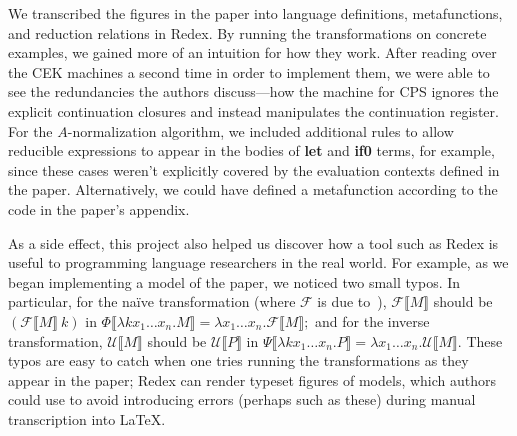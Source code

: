 \documentclass[11pt]{article}
\begin{document}
We transcribed the figures in the paper into language definitions,
metafunctions, and reduction relations in Redex. By running the transformations
on concrete examples, we gained more of an intuition for how they work. After
reading over the CEK machines a second time in order to implement them, we were
able to see the redundancies the authors discuss---how the machine for CPS
ignores the explicit continuation closures and instead manipulates the
continuation register. For the $A$-normalization algorithm, we included
additional rules to allow reducible expressions to appear in the bodies of
\textbf{let} and \textbf{if0} terms, for example, since these cases weren't
explicitly covered by the evaluation contexts defined in the paper.
Alternatively, we could have defined a metafunction according to the code in
the paper's appendix.

As a side effect, this project also helped us discover how a tool such as Redex
is useful to programming language researchers in the real world. For example,
as we began implementing a model of the paper, we noticed two small typos. In
particular, for the na\"{i}ve transformation (where $\mathcal{F}$ is due
to~\citet{Fischer:1993ys}), $\mathcal{F}\llbracket{M\rrbracket}$ should be
$(\mathcal{F}\llbracket{M\rrbracket}\ k)$ in
$\Phi\llbracket{\lambda{k x_1 \ldots x_n}.M\rrbracket} =
\lambda{x_1 \ldots x_n}.\mathcal{F}\llbracket{M\rrbracket};$
and for the inverse transformation,
$\mathcal{U}\llbracket{M\rrbracket}$ should be
$\mathcal{U}\llbracket{P\rrbracket}$ in
$\Psi\llbracket{\lambda{k x_1 \ldots x_n}.P\rrbracket} =
\lambda{x_1 \ldots x_n}.\mathcal{U}\llbracket{M\rrbracket}.$
These typos are easy to catch when one tries running the transformations as
they appear in the paper; Redex can render typeset figures of models, which
authors could use to avoid introducing errors (perhaps such as these) during
manual transcription into \LaTeX.
%





\end{document}
